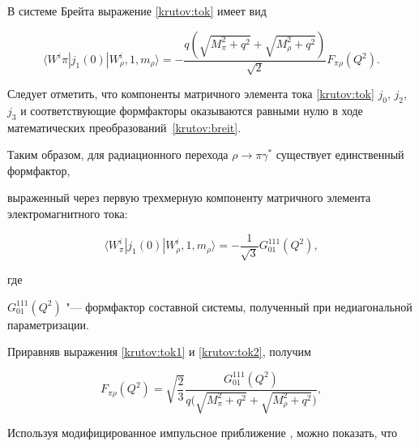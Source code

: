 В системе Брейта выражение \eqref{krutov:tok} имеет вид

%



\begin{equation}\label{krutov:tok1}

\langle{W^i{\pi}}|j_1(0)|{W^i_{\rho}}, 1, m_{\rho}\rangle=-\frac{q

\left(\sqrt{M_{\pi}^{2}+q^2}+\sqrt{M_{\rho}^{2}+q^2}\right)}{\sqrt{2}}F_{\pi\rho}(Q^2).

\end{equation}

Следует отметить, что компоненты матричного элемента тока \eqref{krutov:tok} $j_{0}$, $j_{2}$,  $j_{3}$ и соответствующие формфакторы оказываются равными нулю в ходе математических преобразований~\eqref{krutov:breit}. 

Таким образом, для радиационного перехода $\rho \to \pi\gamma^{*}$ существует единственный формфактор,

выраженный через первую трехмерную компоненту матричного элемента электромагнитного тока:

\begin{equation}\label{krutov:tok2}

\langle{W^i_{\pi}}|j_1(0)|{W^i_{\rho}}, 1, m_{\rho}\rangle=-\frac{1

}{\sqrt{3}}G_{01}^{111}(Q^2),

\end{equation}

где 

$G_{01}^{111}(Q^2)$ "--- формфактор составной системы, полученный при недиагональной параметризации.



Приравняв выражения \eqref{krutov:tok1} и \eqref{krutov:tok2}, получим

\begin{equation}

\label{krutov:transition}

F_{\pi\rho}(Q^2)=\sqrt{\frac{2}{3}} 

\frac{G_{01}^{111}(Q^2)}{q\bigl(\sqrt{M_{\pi}^{2}+q^2}+\sqrt{M_{\rho}^{2}+q^2}\bigr)},

\end{equation}



Используя модифицированное импульсное приближение \cite{KrT09}, можно показать, что

